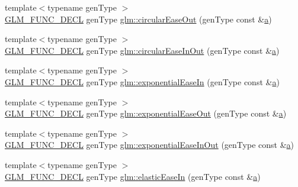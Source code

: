 \begin{DoxyCompactItemize}
\item 
{\footnotesize template$<$typename gen\+Type $>$ }\\\mbox{\hyperlink{setup_8hpp_ab2d052de21a70539923e9bcbf6e83a51}{G\+L\+M\+\_\+\+F\+U\+N\+C\+\_\+\+D\+E\+CL}} gen\+Type \mbox{\hyperlink{group__gtx__easing_ga26fefde9ced9b72745fe21f1a3fe8da7}{glm\+::circular\+Ease\+Out}} (gen\+Type const \&\mbox{\hyperlink{_s_d_l__opengl__glext_8h_a3309789fc188587d666cda5ece79cf82}{a}})
\item 
{\footnotesize template$<$typename gen\+Type $>$ }\\\mbox{\hyperlink{setup_8hpp_ab2d052de21a70539923e9bcbf6e83a51}{G\+L\+M\+\_\+\+F\+U\+N\+C\+\_\+\+D\+E\+CL}} gen\+Type \mbox{\hyperlink{group__gtx__easing_ga0c1027637a5b02d4bb3612aa12599d69}{glm\+::circular\+Ease\+In\+Out}} (gen\+Type const \&\mbox{\hyperlink{_s_d_l__opengl__glext_8h_a3309789fc188587d666cda5ece79cf82}{a}})
\item 
{\footnotesize template$<$typename gen\+Type $>$ }\\\mbox{\hyperlink{setup_8hpp_ab2d052de21a70539923e9bcbf6e83a51}{G\+L\+M\+\_\+\+F\+U\+N\+C\+\_\+\+D\+E\+CL}} gen\+Type \mbox{\hyperlink{group__gtx__easing_ga7f24ee9219ab4c84dc8de24be84c1e3c}{glm\+::exponential\+Ease\+In}} (gen\+Type const \&\mbox{\hyperlink{_s_d_l__opengl__glext_8h_a3309789fc188587d666cda5ece79cf82}{a}})
\item 
{\footnotesize template$<$typename gen\+Type $>$ }\\\mbox{\hyperlink{setup_8hpp_ab2d052de21a70539923e9bcbf6e83a51}{G\+L\+M\+\_\+\+F\+U\+N\+C\+\_\+\+D\+E\+CL}} gen\+Type \mbox{\hyperlink{group__gtx__easing_ga517f2bcfd15bc2c25c466ae50808efc3}{glm\+::exponential\+Ease\+Out}} (gen\+Type const \&\mbox{\hyperlink{_s_d_l__opengl__glext_8h_a3309789fc188587d666cda5ece79cf82}{a}})
\item 
{\footnotesize template$<$typename gen\+Type $>$ }\\\mbox{\hyperlink{setup_8hpp_ab2d052de21a70539923e9bcbf6e83a51}{G\+L\+M\+\_\+\+F\+U\+N\+C\+\_\+\+D\+E\+CL}} gen\+Type \mbox{\hyperlink{group__gtx__easing_ga232fb6dc093c5ce94bee105ff2947501}{glm\+::exponential\+Ease\+In\+Out}} (gen\+Type const \&\mbox{\hyperlink{_s_d_l__opengl__glext_8h_a3309789fc188587d666cda5ece79cf82}{a}})
\item 
{\footnotesize template$<$typename gen\+Type $>$ }\\\mbox{\hyperlink{setup_8hpp_ab2d052de21a70539923e9bcbf6e83a51}{G\+L\+M\+\_\+\+F\+U\+N\+C\+\_\+\+D\+E\+CL}} gen\+Type \mbox{\hyperlink{group__gtx__easing_ga230918eccee4e113d10ec5b8cdc58695}{glm\+::elastic\+Ease\+In}} (gen\+Type const \&\mbox{\hyperlink{_s_d_l__opengl__glext_8h_a3309789fc188587d666cda5ece79cf82}{a}})

\end{DoxyCompactItemize}

